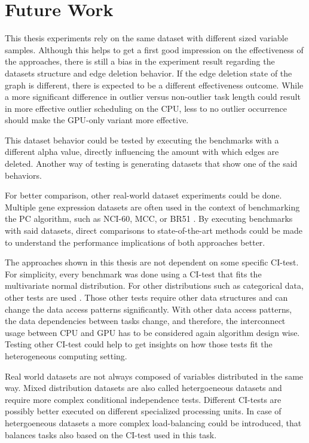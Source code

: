 \chapter{Future Work}
This thesis experiments rely on the same dataset with different sized variable samples. Although this helps to get a first good impression on the effectiveness of the approaches, there is still a bias in the experiment result regarding the datasets structure and edge deletion behavior. If the edge deletion state of the graph is different, there is expected to be a different effectiveness outcome. While a more significant difference in outlier versus non-outlier task length could result in more effective outlier scheduling on the CPU, less to no outlier occurrence should make the GPU-only variant more effective.

This dataset behavior could be tested by executing the benchmarks with a different alpha value, directly influencing the amount with which edges are deleted. Another way of testing is generating datasets that show one of the said behaviors.

For better comparison, other real-world dataset experiments could be done. Multiple gene expression datasets are often used in the context of benchmarking the PC algorithm, such as NCI-60, MCC, or BR51 \cite{leFastPCAlgorithm2019}. By executing benchmarks with said datasets, direct comparisons to state-of-the-art methods could be made to understand the performance implications of both approaches better.

The approaches shown in this thesis are not dependent on some specific CI-test. For simplicity, every benchmark was done using a CI-test that fits the multivariate normal distribution. For other distributions such as categorical data, other tests are used \cite{scutariLearningBayesianNetworks2010}. Those other tests require other data structures and can change the data access patterns significantly. With other data access patterns, the data dependencies between tasks change, and therefore, the interconnect usage between CPU and GPU has to be considered again algorithm design wise. Testing other CI-test could help to get insights on how those tests fit the heterogeneous computing setting.

Real world datasets are not always composed of variables distributed in the same way. Mixed distribution datasets are also called hetergoeneous datasets and require more complex conditional independence tests. Different CI-tests are possibly better executed on different specialized processing units. In case of hetergoeneous datasets a more complex load-balancing could be introduced, that balances tasks also based on the CI-test used in this task.

